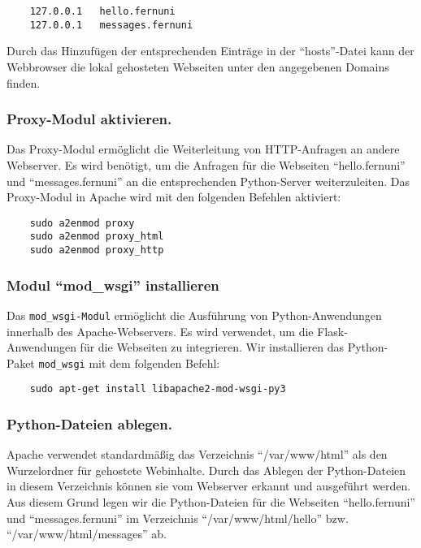 \begin{verbatim}
    127.0.0.1 	hello.fernuni
    127.0.0.1 	messages.fernuni
\end{verbatim}

Durch das Hinzufügen der entsprechenden Einträge in der \enquote{hosts}-Datei kann der Webbrowser die lokal gehosteten Webseiten unter den angegebenen Domains finden.

\subsubsection*{Proxy-Modul aktivieren.}
Das Proxy-Modul ermöglicht die Weiterleitung von HTTP-Anfragen an andere Webserver. Es wird benötigt, um die Anfragen für die Webseiten \enquote{hello.fernuni} und \enquote{messages.fernuni} an die entsprechenden Python-Server weiterzuleiten.
Das Proxy-Modul in Apache wird mit den folgenden Befehlen aktiviert:

\begin{verbatim}
    sudo a2enmod proxy
    sudo a2enmod proxy_html
    sudo a2enmod proxy_http
\end{verbatim}

\subsubsection*{Modul \enquote{mod\_wsgi} installieren}

Das \verb+mod_wsgi-Modul+ ermöglicht die Ausführung von Python-Anwendungen innerhalb des Apache-Webservers. Es wird verwendet, um die Flask-Anwendungen für die Webseiten zu integrieren.
Wir installieren das Python-Paket \verb+mod_wsgi+ mit dem folgenden Befehl:

\begin{verbatim}
    sudo apt-get install libapache2-mod-wsgi-py3
\end{verbatim}

\subsubsection*{Python-Dateien ablegen.}

Apache verwendet standardmäßig das Verzeichnis \enquote{/var/www/html} als den Wurzelordner für gehostete Webinhalte. Durch das Ablegen der Python-Dateien in diesem Verzeichnis können sie vom Webserver erkannt und ausgeführt werden.
Aus diesem Grund legen wir die Python-Dateien für die Webseiten \enquote{hello.fernuni} und \enquote{messages.fernuni} im Verzeichnis \enquote{/var/www/html/hello}  bzw. \enquote{/var/www/html/messages} ab. 

